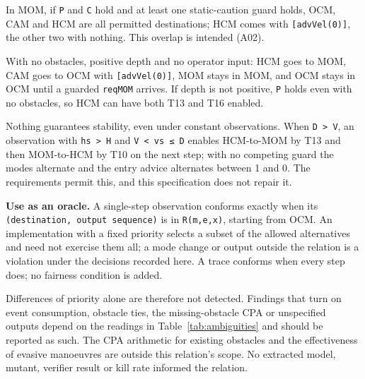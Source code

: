 \documentclass[
  10pt,
]{article}
\begin{document}
In MOM, if \texttt{P} and \texttt{C} hold and at least one
static-caution guard holds, OCM, CAM and HCM are all permitted
destinations; HCM comes with \texttt{{[}advVel(0){]}}, the other two
with nothing. This overlap is intended (A02).

With no obstacles, positive depth and no operator input: HCM goes to
MOM, CAM goes to OCM with \texttt{{[}advVel(0){]}}, MOM stays in MOM,
and OCM stays in OCM until a guarded \texttt{reqMOM} arrives. If depth
is not positive, \texttt{P} holds even with no obstacles, so HCM can
have both T13 and T16 enabled.

Nothing guarantees stability, even under constant observations. When
\texttt{D\ \textgreater{}\ V}, an observation with
\texttt{hs\ \textgreater{}\ H} and \texttt{V\ \textless{}\ vs\ ≤\ D}
enables HCM-to-MOM by T13 and then MOM-to-HCM by T10 on the next step;
with no competing guard the modes alternate and the entry advice
alternates between 1 and 0. The requirements permit this, and this
specification does not repair it.

\textbf{Use as an oracle.} A single-step observation conforms exactly
when its \texttt{(destination,\ output\ sequence)} is in
\texttt{R(m,e,x)}, starting from OCM. An implementation with a fixed
priority selects a subset of the allowed alternatives and need not
exercise them all; a mode change or output outside the relation is a
violation under the decisions recorded here. A trace conforms when every
step does; no fairness condition is added.

Differences of priority alone are therefore not detected. Findings that
turn on event consumption, obstacle ties, the missing-obstacle CPA or
unspecified outputs depend on the readings in Table~\ref{tab:ambiguities} and should be reported as such.
The CPA arithmetic for existing obstacles and the effectiveness of
evasive manoeuvres are outside this relation's scope. No extracted
model, mutant, verifier result or kill rate informed the relation.
\end{document}
